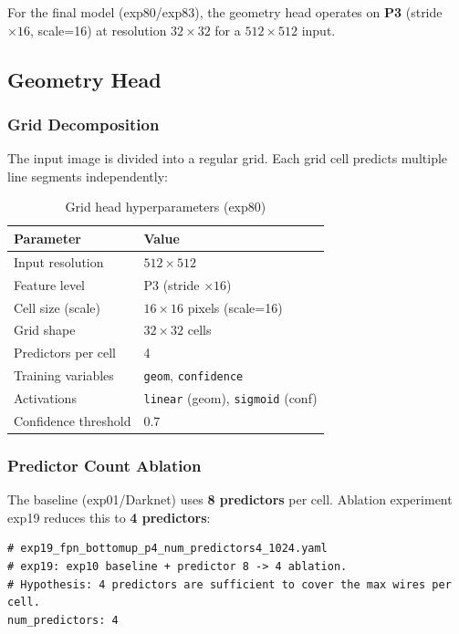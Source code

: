 \documentclass[11pt,a4paper]{article}
\begin{document}
For the final model (exp80/exp83), the geometry head operates on
\textbf{P3} (stride $\times16$, scale=16) at resolution $32 \times 32$
for a $512 \times 512$ input.

\subsection{Geometry Head}
\label{subsec:geom_head}

\subsubsection{Grid Decomposition}

The input image is divided into a regular grid.
Each grid cell predicts multiple line segments independently:

\begin{table}[H]
\centering
\caption{Grid head hyperparameters (exp80)}
\begin{tabular}{ll}
\toprule
Parameter & Value \\
\midrule
Input resolution & $512 \times 512$ \\
Feature level & P3 (stride $\times 16$) \\
Cell size (scale) & $16 \times 16$ pixels (scale=16) \\
Grid shape & $32 \times 32$ cells \\
Predictors per cell & 4 \\
Training variables & \texttt{geom}, \texttt{confidence} \\
Activations & \texttt{linear} (geom), \texttt{sigmoid} (conf) \\
Confidence threshold & 0.7 \\
\bottomrule
\end{tabular}
\end{table}

\subsubsection{Predictor Count Ablation}

The baseline (exp01/Darknet) uses \textbf{8 predictors} per cell.
Ablation experiment exp19 reduces this to \textbf{4 predictors}:

\begin{lstlisting}
# exp19_fpn_bottomup_p4_num_predictors4_1024.yaml
# exp19: exp10 baseline + predictor 8 -> 4 ablation.
# Hypothesis: 4 predictors are sufficient to cover the max wires per cell.
num_predictors: 4
\end{lstlisting}
\end{document}
